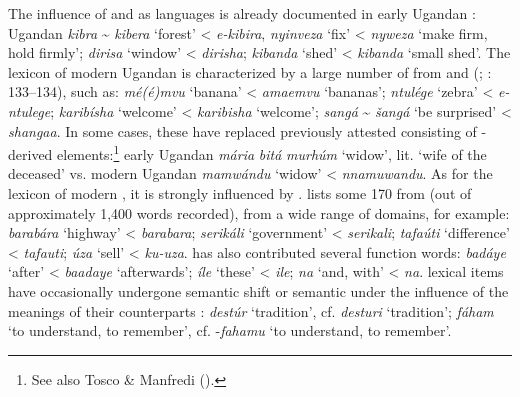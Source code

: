 \documentclass[output=paper]{langsci/langscibook}
\begin{document}
The influence of  and  as  languages is already documented in early Ugandan  \citep{Avram2017talk}: Ugandan  \textit{kibra} {\textasciitilde} \textit{kibera} ‘forest’ <  \textit{e-kibira}, \textit{nyinveza} ‘fix’ <  \textit{nyweza} ‘make firm, hold firmly’; \textit{dirisa} ‘window’ <  \textit{dirisha}; \textit{kibanda} ‘shed’ <  \textit{kibanda} ‘small shed’. The lexicon of modern Ugandan  is characterized by a large number of  from  and  (\citealt{Wellens2003}; \citealt{Nakao2012}: 133–134), such as: \textit{mé(é}\textit{)mvu} ‘banana’ <  \textit{amaemvu} ‘bananas’; \textit{ntulége} ‘zebra’ <  \textit{e-ntulege}; \textit{karibísha} ‘welcome’ <  \textit{karibisha} ‘welcome’; \textit{sangá} {\textasciitilde}  \textit{šangá} ‘be surprised’ <  \textit{shangaa}. In some cases, these  have replaced previously attested  consisting of -derived elements:\footnote{See also Tosco \& Manfredi (\citeyear[509]{ToscoManfredi2013}).} early Ugandan  \textit{mária} \textit{bitá} \textit{murhúm} ‘widow’, lit. ‘wife of the deceased’ vs. modern Ugandan  \textit{mamwándu} ‘widow’ <  \textit{nnamuwandu}. As for the lexicon of modern , it is strongly influenced by . \citet{Luffin2004} lists some 170  from  (out of approximately 1,400 words recorded), from a wide range of domains, for example: \textit{barabára} ‘highway’ <  \textit{barabara}; \textit{serikáli} ‘government’ <  \textit{serikali}; \textit{tafaúti} ‘difference’ <  \textit{tafauti}; \textit{úza} ‘sell’ <  \textit{ku-uza}.  has also contributed several function words: \textit{badáye} ‘after’ <  \textit{baadaye} ‘afterwards’; \textit{íle} ‘these’ <  \textit{ile}; \textit{na} ‘and, with’ <  \textit{na}.  lexical items have occasionally undergone semantic shift or semantic  under the influence of the meanings of their  counterparts \citep[315]{Luffin2014}: \textit{destúr} ‘tradition’, cf.  \textit{desturi} ‘tradition’; \textit{fáham} ‘to understand, to remember’, cf.  -\textit{fahamu} ‘to understand, to remember’. 
\end{document}
